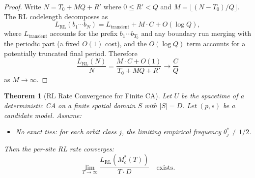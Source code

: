 \documentclass[11pt]{article}
\newtheorem{theorem}{Theorem}
\theoremstyle{definition}
\theoremstyle{remark}
\newcommand{\RL}{\operatorname{RL}}
\begin{document}
\begin{proof}
Write $N = T_0 + M Q + R'$ where $0 \leq R' < Q$ and $M = \lfloor (N - T_0)/Q \rfloor$.
The RL codelength decomposes as
\[
L_{\RL}(b_1 \cdots b_N) = L_{\text{transient}} + M \cdot C + O(\log Q),
\]
where $L_{\text{transient}}$ accounts for the prefix $b_1 \cdots b_{T_0}$ and any boundary run merging with the periodic part (a fixed $O(1)$ cost), and the $O(\log Q)$ term accounts for a potentially truncated final period.
Therefore
\[
\frac{L_{\RL}(N)}{N} = \frac{M \cdot C + O(1)}{T_0 + MQ + R'} \to \frac{C}{Q}
\]
as $M \to \infty$.
\end{proof}

\begin{theorem}[RL Rate Convergence for Finite CA]\label{thm:rl-convergence}
Let $U$ be the spacetime of a deterministic CA on a finite spatial domain $S$ with $|S| = D$.
Let $(p, s)$ be a candidate model.
Assume:
\begin{itemize}
    \item[\textup{(NT)}] \emph{No exact ties}: for each orbit class $j$, the limiting empirical frequency $\theta_j^* \neq 1/2$.
\end{itemize}
Then the per-site RL rate converges:
\[
\lim_{T \to \infty} \frac{L_{\RL}(M^*_c(T))}{T \cdot D} \quad \text{exists}.
\]
\end{theorem}
\end{document}
